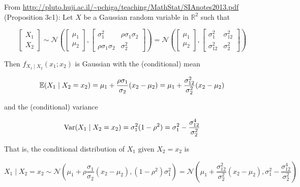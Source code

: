 \begin{proposition}\label{prob.cond.bivar.norm.dist}

From \url{http://pluto.huji.ac.il/~pchiga/teaching/MathStat/SIAnotes2013.pdf} (Proposition 3c1): Let \(X\) be a Gaussian random variable in \(\mathbb{R}^2\) such that

\[
\begin{bmatrix} X_1 \\ X_2 \end{bmatrix}  \sim \mathcal{N}\left(\begin{bmatrix} \mu_1 \\ \mu_2 \end{bmatrix}, \begin{bmatrix} \sigma_1^2 & \rho \sigma_1 \sigma_2 \\  \rho \sigma_1 \sigma_2 & \sigma_2^2 \end{bmatrix}  \right) =  \mathcal{N}\left(\begin{bmatrix} \mu_1 \\ \mu_2 \end{bmatrix}, \begin{bmatrix} \sigma_1^2 &\sigma_{12}^2 \\  \sigma_{12}^2 & \sigma_2^2 \end{bmatrix}  \right)
\]

Then \(f_{X_1 \mid X_2}(x_1; x_2)\) is Gaussian with the (conditional) mean

\[
\E(X_1 \mid X_2 = x_2) = \mu_1 + \frac{\rho \sigma_1}{\sigma_2} (x_2 - \mu_2) = \mu_1 + \frac{\sigma_{12}^2}{ \sigma_2^2} (x_2 - \mu_2)
\]

and the (conditional) variance

\[
\Var(X_1 \mid X_2 = x_2) = \sigma_1^2 (1 - \rho^2) =  \sigma_1^2 - \frac{\sigma_{12}^4}{ \sigma_2^2}
\]

That is, the conditional distribution of \(X_1\) given \(X_2 = x_2\) is

\[
X_1 \mid X_2 = x_2 \sim \mathcal{N} \left( \mu_1 + \rho \frac{\sigma_1}{\sigma_2}(x_2 - \mu_2), (1 - \rho^2)\sigma_1^2 \right) = \mathcal{N} \left( \mu_1 + \frac{\sigma_{12}^2}{ \sigma_2^2} (x_2 - \mu_2), \sigma_1^2 - \frac{\sigma_{12}^4}{ \sigma_2^2} \right)
\]
\end{proposition} 

